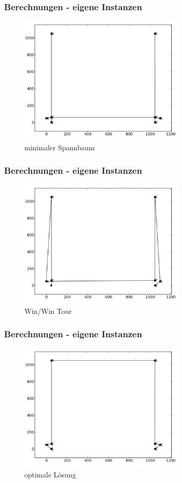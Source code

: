 \documentclass[12pt]{beamer}
\begin{document}
    \begin{frame}
        \frametitle{Berechnungen - eigene Instanzen}
        \begin{figure}[H]
            \centering
            \includegraphics[width=8cm]{gfx/hoogeveen_hpp_mst}
            \caption{minimaler Spannbaum}
        \end{figure}
    \end{frame}
    \begin{frame}
        \frametitle{Berechnungen - eigene Instanzen}
        \begin{figure}[H]
            \centering
            \includegraphics[width=8cm]{gfx/hoogeveen_hpp_tour}
            \caption{Win/Win Tour}
        \end{figure}
    \end{frame}
    \begin{frame}
        \frametitle{Berechnungen - eigene Instanzen}
        \begin{figure}[H]
            \centering
            \includegraphics[width=8cm]{gfx/hoogeveen_hpp_optimal}
            \caption{optimale Lösung}
        \end{figure}
    \end{frame}
\end{document}
